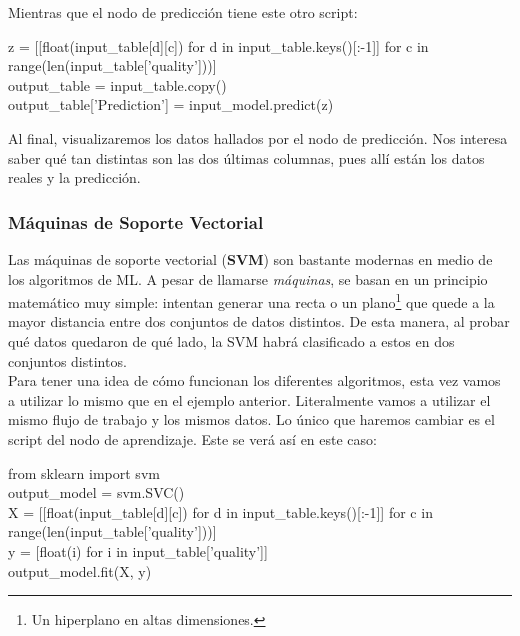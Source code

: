 \documentclass[10pt,letterpaper]{article}
\newenvironment{Code}
{
\begin{lrbox}{\selvestebox}%
\begin{minipage}{\dimexpr\columnwidth-2\fboxsep\relax}
\fontfamily{\ttdefault}\selectfont
}
{\end{minipage}\end{lrbox}%
\begin{center}
\colorbox{light-gray}{\usebox{\selvestebox}}
\end{center}
}
\begin{document}
\noindent Mientras que el nodo de predicci\'on tiene este otro script:

\begin{Code}
z = [[float(input\_table[d][c]) for d in input\_table.keys()[:-1]] for c in range(len(input\_table['quality']))]\\

output\_table = input\_table.copy()\\

output\_table['Prediction'] = input\_model.predict(z)
\end{Code}

Al final, visualizaremos los datos hallados por el nodo de predicci\'on. Nos interesa saber qu\'e tan distintas son las dos \'ultimas columnas, pues all\'i est\'an los datos reales y la predicci\'on.

\subsubsection{M\'aquinas de Soporte Vectorial}
Las m\'aquinas de soporte vectorial (\textbf{SVM}) son bastante modernas en medio de los algoritmos de ML. A pesar de llamarse \emph{m\'aquinas}, se basan en un principio matem\'atico muy simple: intentan generar una recta o un plano\footnote{Un hiperplano en altas dimensiones.} que quede a la mayor distancia entre dos conjuntos de datos distintos. De esta manera, al probar qu\'e datos quedaron de qu\'e lado, la SVM habr\'a clasificado a estos en dos conjuntos distintos.\\

Para tener una idea de c\'omo funcionan los diferentes algoritmos, esta vez vamos a utilizar lo mismo que en el ejemplo anterior. Literalmente vamos a utilizar el mismo flujo de trabajo y los mismos datos. Lo \'unico que haremos cambiar es el script del nodo de aprendizaje. Este se ver\'a as\'i en este caso:

\begin{Code}
from sklearn import svm\\

output\_model = svm.SVC()\\

X = [[float(input\_table[d][c]) for d in input\_table.keys()[:-1]] for c in range(len(input\_table['quality']))]\\
y = [float(i) for i in input\_table['quality']]\\

output\_model.fit(X, y)
\end{Code}
\end{document}
